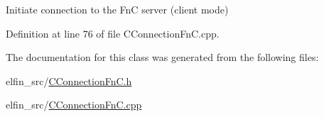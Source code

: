Initiate connection to the Fn\-C server (client mode) 



Definition at line 76 of file C\-Connection\-Fn\-C.\-cpp.



The documentation for this class was generated from the following files\-:\begin{DoxyCompactItemize}
\item 
elfin\-\_\-src/\hyperlink{_c_connection_fn_c_8h}{C\-Connection\-Fn\-C.\-h}\item 
elfin\-\_\-src/\hyperlink{_c_connection_fn_c_8cpp}{C\-Connection\-Fn\-C.\-cpp}\end{DoxyCompactItemize}
